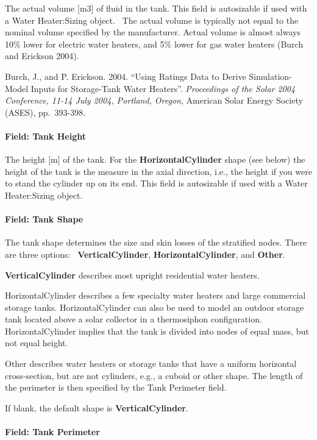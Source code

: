The actual volume {[}m3{]} of fluid in the tank. This field is autosizable if used with a Water Heater:Sizing object.~ The actual volume is typically not equal to the nominal volume specified by the manufacturer. Actual volume is almost always 10\% lower for electric water heaters, and 5\% lower for gas water heaters (Burch and Erickson 2004).

Burch, J., and P. Erickson. 2004. ``Using Ratings Data to Derive Simulation-Model Inputs for Storage-Tank Water Heaters''. \emph{Proceedings of the Solar 2004 Conference, 11-14 July 2004, Portland, Oregon}, American Solar Energy Society (ASES), pp.~393-398.

\paragraph{Field: Tank Height}\label{field-tank-height-000}

The height {[}m{]} of the tank. For the \textbf{HorizontalCylinder} shape (see below) the height of the tank is the measure in the axial direction, i.e., the height if you were to stand the cylinder up on its end. This field is autosizable if used with a Water Heater:Sizing object.

\paragraph{Field: Tank Shape}\label{field-tank-shape-000}

The tank shape determines the size and skin losses of the stratified nodes. There are three options:~ \textbf{VerticalCylinder}, \textbf{HorizontalCylinder}, and \textbf{Other}.

\textbf{VerticalCylinder} describes most upright residential water heaters.

HorizontalCylinder describes a few specialty water heaters and large commercial storage tanks. HorizontalCylinder can also be used to model an outdoor storage tank located above a solar collector in a thermosiphon configuration. HorizontalCylinder implies that the tank is divided into nodes of equal mass, but not equal height.

Other describes water heaters or storage tanks that have a uniform horizontal cross-section, but are not cylinders, e.g., a cuboid or other shape. The length of the perimeter is then specified by the Tank Perimeter field.

If blank, the default shape is \textbf{VerticalCylinder}.

\paragraph{Field: Tank Perimeter}\label{field-tank-perimeter-000}

